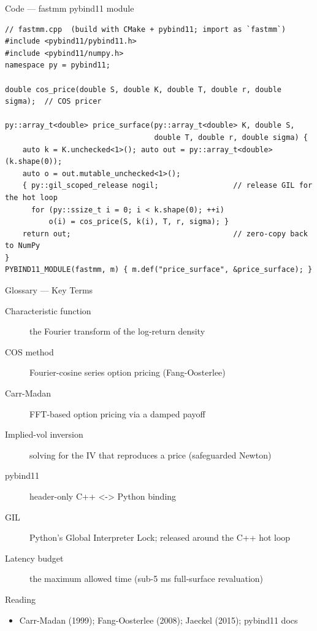 \documentclass[aspectratio=169,10pt]{beamer}
\begin{document}
\begin{frame}[fragile]{Code --- fastmm pybind11 module}
\begin{lstlisting}
// fastmm.cpp  (build with CMake + pybind11; import as `fastmm`)
#include <pybind11/pybind11.h>
#include <pybind11/numpy.h>
namespace py = pybind11;

double cos_price(double S, double K, double T, double r, double sigma);  // COS pricer

py::array_t<double> price_surface(py::array_t<double> K, double S,
                                  double T, double r, double sigma) {
    auto k = K.unchecked<1>(); auto out = py::array_t<double>(k.shape(0));
    auto o = out.mutable_unchecked<1>();
    { py::gil_scoped_release nogil;                 // release GIL for the hot loop
      for (py::ssize_t i = 0; i < k.shape(0); ++i)
          o(i) = cos_price(S, k(i), T, r, sigma); }
    return out;                                     // zero-copy back to NumPy
}
PYBIND11_MODULE(fastmm, m) { m.def("price_surface", &price_surface); }
\end{lstlisting}
\end{frame}
\begin{frame}{Glossary --- Key Terms}
\footnotesize\begin{description}
\item[\color{ncsured}Characteristic function] the Fourier transform of the log-return density
\item[\color{ncsured}COS method] Fourier-cosine series option pricing (Fang-Oosterlee)
\item[\color{ncsured}Carr-Madan] FFT-based option pricing via a damped payoff
\item[\color{ncsured}Implied-vol inversion] solving for the IV that reproduces a price (safeguarded Newton)
\item[\color{ncsured}pybind11] header-only C++ \textless{}-\textgreater{} Python binding
\item[\color{ncsured}GIL] Python's Global Interpreter Lock; released around the C++ hot loop
\item[\color{ncsured}Latency budget] the maximum allowed time (sub-5 ms full-surface revaluation)
\end{description}
\end{frame}

\begin{frame}{Reading}
\begin{itemize}
  \item Carr-Madan (1999); Fang-Oosterlee (2008); Jaeckel (2015); pybind11 docs
\end{itemize}
\end{frame}
\end{document}
